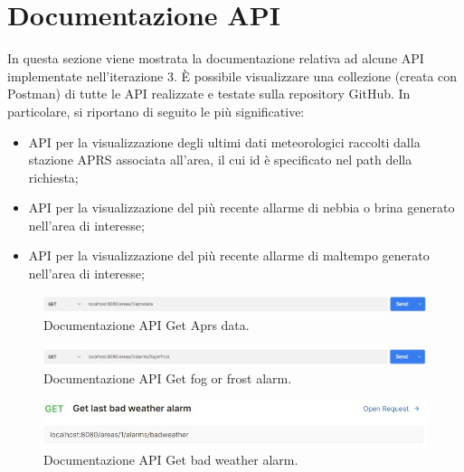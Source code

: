 \section{Documentazione API}

In questa sezione viene mostrata la documentazione relativa ad alcune API implementate nell'iterazione 3. \`E possibile visualizzare una collezione (creata con Postman) di tutte le API realizzate e testate sulla repository GitHub. In particolare, si riportano di seguito le più significative:
\begin{itemize}
	\item API per la visualizzazione degli ultimi dati meteorologici raccolti dalla stazione APRS associata all'area, il cui id è specificato nel path della richiesta;
	\item API per la visualizzazione del più recente allarme di nebbia o brina generato nell'area di interesse;
	\item API per la visualizzazione del più recente allarme di maltempo generato nell'area di interesse;
\end{itemize}

\begin{figure}[h!]
	\centering
	\includegraphics[width=1\linewidth]{./Iterazione 3/ImageFiles/GetAprsDataRequest}
	
	\caption{Documentazione API Get Aprs data.}
	\label{fig:GetAprsDataAPI}
\end{figure}

\begin{figure}[h!]
	\centering
	\includegraphics[width=1\linewidth]{./Iterazione 3/ImageFiles/GetFrostOrFogAlarmRequest}
	
	\caption{Documentazione API Get fog or frost alarm.}
	\label{fig:GetFrostOrFogAlarm}
\end{figure}

\begin{figure}[h!]
	\centering
	\includegraphics[width=1\linewidth]{./Iterazione 3/ImageFiles/GetBadWeatherAlarmRequest}
	
	\caption{Documentazione API Get bad weather alarm.}
	\label{fig:GetBadWeatherAlarm}
\end{figure}

\clearpage


